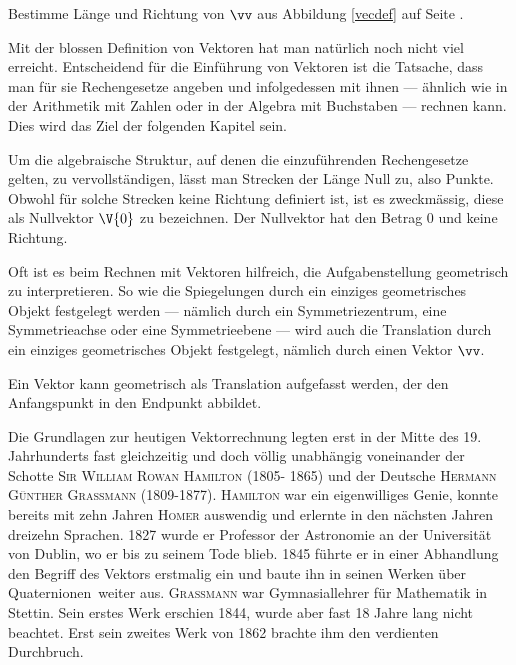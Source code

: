 \documentclass[%
11pt,%
twoside,%
titlepage,%
german,%
headsepline%
]{scrartcl}
\begin{document}
\begin{ueb}
Bestimme Länge und Richtung von $\vv$ aus Abbildung \ref{vecdef} auf Seite \pageref{vecdef}.
\end{ueb}

Mit der blossen Definition von Vektoren hat man natürlich noch nicht viel erreicht. Entscheidend für die Einführung von Vektoren ist die Tatsache, dass man für sie Rechengesetze angeben und infolgedessen mit ihnen --- ähnlich wie in der Arithmetik mit Zahlen oder in der Algebra mit Buchstaben --- rechnen kann. Dies wird das Ziel der folgenden Kapitel sein.

\begin{bem}
Um die algebraische Struktur, auf denen die einzuführenden Rechengesetze gelten, zu vervollständigen, lässt man Strecken der Länge Null zu, also Punkte. Obwohl für solche Strecken keine Richtung definiert ist, ist es zweckmässig, diese als Nullvektor $\V{0}$ zu bezeichnen. Der Nullvektor hat den Betrag $0$ und keine Richtung.
\end{bem}

Oft ist es beim Rechnen mit Vektoren hilfreich, die Aufgabenstellung geometrisch zu interpretieren. So wie die Spiegelungen durch ein einziges geometrisches Objekt festgelegt werden --- nämlich durch ein Symmetriezentrum, eine Symmetrieachse oder eine Symmetrieebene --- wird auch die Translation durch ein einziges geometrisches Objekt festgelegt, nämlich durch einen Vektor $\vv$.
\begin{bem}
Ein Vektor kann geometrisch als Translation aufgefasst werden, der den Anfangspunkt in den Endpunkt abbildet.
\end{bem}

Die Grundlagen zur heutigen Vektorrechnung legten erst in der Mitte des 19. Jahrhunderts fast gleichzeitig und doch völlig unabhängig voneinander der Schotte \textsc{Sir William Rowan Hamilton} (1805- 1865) und der Deutsche \textsc{Hermann Günther Grassmann} (1809-1877). \textsc{Hamilton} war ein eigenwilliges Genie, konnte bereits mit zehn Jahren \textsc{Homer} auswendig und erlernte in den nächsten Jahren dreizehn Sprachen. 1827 wurde er Professor der Astronomie an der Universität von Dublin, wo er bis zu seinem Tode blieb. 1845 führte er in einer Abhandlung den Begriff des Vektors erstmalig ein und baute ihn in seinen Werken über \glqq Quaternionen\grqq\ weiter aus. \textsc{Grassmann} war Gymnasiallehrer für Mathematik in Stettin. Sein erstes Werk erschien 1844, wurde aber fast 18 Jahre lang nicht beachtet. Erst sein zweites Werk von 1862 brachte ihm den verdienten Durchbruch.
\end{document}
